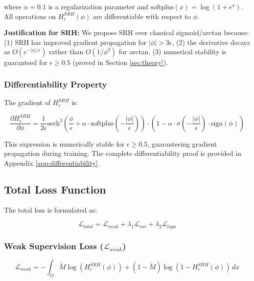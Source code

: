 \documentclass[12pt, a4paper]{article}
\newcommand{\calL}{\mathcal{L}}
\begin{document}
where $\alpha = 0.1$ is a regularization parameter and $\text{softplus}(x) = \log(1 + e^x)$. All operations on $H_\epsilon^{SRH}(\phi)$ are differentiable with respect to $\phi$.

\textbf{Justification for SRH:} We propose SRH over classical sigmoid/arctan because: (1) SRH has improved gradient propagation for $|\phi| > 3\epsilon$, (2) the derivative decays as $O(e^{-|\phi|/\epsilon})$ rather than $O(1/\phi^2)$ for arctan, (3) numerical stability is guaranteed for $\epsilon \geq 0.5$ (proved in Section \ref{sec:theory}).

\subsubsection{Differentiability Property}

The gradient of $H_\epsilon^{SRH}$ is:

\begin{equation}
\frac{\partial H_\epsilon^{SRH}}{\partial \phi} = \frac{1}{2\epsilon}\text{sech}^2\left(\frac{\phi}{\epsilon} + \alpha \cdot \text{softplus}\left(-\frac{|\phi|}{\epsilon}\right)\right) \cdot \left(1 - \alpha \cdot \sigma\left(-\frac{|\phi|}{\epsilon}\right) \cdot \text{sign}(\phi)\right)
\label{eq:srh_derivative}
\end{equation}

This expression is numerically stable for $\epsilon \geq 0.5$, guaranteeing gradient propagation during training. The complete differentiability proof is provided in Appendix \ref{app:differentiability}.

\subsection{Total Loss Function}
\label{subsec:loss_function}

The total loss is formulated as:

\begin{equation}
\calL_{total} = \calL_{weak} + \lambda_1 \calL_{var} + \lambda_2 \calL_{topo}
\label{eq:total_loss}
\end{equation}

\subsubsection{Weak Supervision Loss ($\calL_{weak}$)}

\begin{equation}
\calL_{weak} = - \int_{\Omega} \tilde{M} \log(H_\epsilon^{SRH}(\phi)) + (1 - \tilde{M}) \log(1 - H_\epsilon^{SRH}(\phi)) \, dx
\label{eq:weak_loss}
\end{equation}
\end{document}
